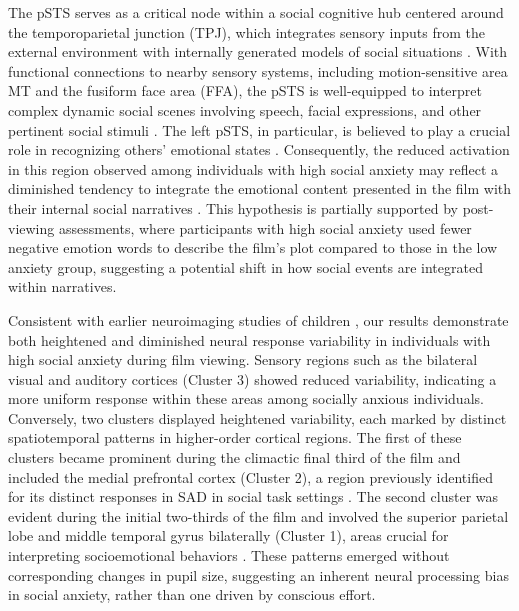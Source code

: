 The pSTS serves as a critical node within a social cognitive hub centered around the temporoparietal junction (TPJ), which integrates sensory inputs from the external environment with internally generated models of social situations \citep{patel2019}. With functional connections to nearby sensory systems, including motion-sensitive area MT and the fusiform face area (FFA), the pSTS is well-equipped to interpret complex dynamic social scenes involving speech, facial expressions, and other pertinent social stimuli \citep{dasgupta2017,ferreira2015,jabbi2015,lahnakoski2012,mottonen2006,shultz2015}. The left pSTS, in particular, is believed to play a crucial role in recognizing others' emotional states \citep{peelen2010,samson2004}. Consequently, the reduced activation in this region observed among individuals with high social anxiety may reflect a diminished tendency to integrate the emotional content presented in the film with their internal social narratives \citep{davey2016}. This hypothesis is partially supported by post-viewing assessments, where participants with high social anxiety used fewer negative emotion words to describe the film's plot compared to those in the low anxiety group, suggesting a potential shift in how social events are integrated within narratives.

Consistent with earlier neuroimaging studies of children \citep{camacho2023}, our results demonstrate both heightened and diminished neural response variability in individuals with high social anxiety during film viewing. Sensory regions such as the bilateral visual and auditory cortices (Cluster 3) showed reduced variability, indicating a more uniform response within these areas among socially anxious individuals. Conversely, two clusters displayed heightened variability, each marked by distinct spatiotemporal patterns in higher-order cortical regions. The first of these clusters became prominent during the climactic final third of the film and included the medial prefrontal cortex (Cluster 2), a region previously identified for its distinct responses in SAD in social task settings \citep{sripada2009,lorberbaum2004}. The second cluster was evident during the initial two-thirds of the film and involved the superior parietal lobe and middle temporal gyrus bilaterally (Cluster 1), areas crucial for interpreting socioemotional behaviors \citep{filimon2007,grosbras2006,lombardo2010,regenbogen2012}. These patterns emerged without corresponding changes in pupil size, suggesting an inherent neural processing bias in social anxiety, rather than one driven by conscious effort. 

